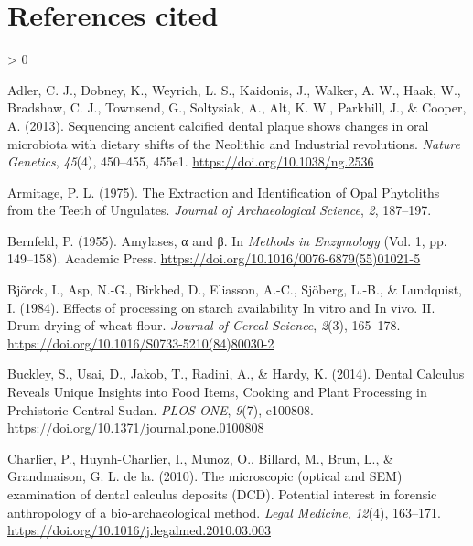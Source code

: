 \documentclass[
]{article}
\newlength{\cslhangindent}
\newenvironment{CSLReferences}[2] %
 {%
  \setlength{\parindent}{0pt}
  \ifodd #1 \everypar{\setlength{\hangindent}{\cslhangindent}}\ignorespaces\fi
  \ifnum #2 > 0
  \setlength{\parskip}{#2\baselineskip}
  \fi
 }%
 {}
\begin{document}
\hypertarget{references-cited}{%
\section*{References cited}\label{references-cited}}

\hypertarget{refs}{}
\begin{CSLReferences}{1}{0}
\leavevmode\hypertarget{ref-adlerSequencingAncientCalcified2013}{}%
Adler, C. J., Dobney, K., Weyrich, L. S., Kaidonis, J., Walker, A. W., Haak, W., Bradshaw, C. J., Townsend, G., Soltysiak, A., Alt, K. W., Parkhill, J., \& Cooper, A. (2013). Sequencing ancient calcified dental plaque shows changes in oral microbiota with dietary shifts of the {Neolithic} and {Industrial} revolutions. \emph{Nature Genetics}, \emph{45}(4), 450--455, 455e1. \url{https://doi.org/10.1038/ng.2536}

\leavevmode\hypertarget{ref-armitageExtractionIdentificationOpal1975}{}%
Armitage, P. L. (1975). The {Extraction} and {Identification} of {Opal Phytoliths} from the {Teeth} of {Ungulates}. \emph{Journal of Archaeological Science}, \emph{2}, 187--197.

\leavevmode\hypertarget{ref-bernfeldAmylase1955}{}%
Bernfeld, P. (1955). Amylases, α and β. In \emph{Methods in {Enzymology}} (Vol. 1, pp. 149--158). {Academic Press}. \url{https://doi.org/10.1016/0076-6879(55)01021-5}

\leavevmode\hypertarget{ref-bjorckStarchProcessing1984}{}%
Björck, I., Asp, N.-G., Birkhed, D., Eliasson, A.-C., Sjöberg, L.-B., \& Lundquist, I. (1984). Effects of processing on starch availability {In} vitro and {In} vivo. {II}. {Drum}-drying of wheat flour. \emph{Journal of Cereal Science}, \emph{2}(3), 165--178. \url{https://doi.org/10.1016/S0733-5210(84)80030-2}

\leavevmode\hypertarget{ref-buckleyDentalCalculusCooking2014}{}%
Buckley, S., Usai, D., Jakob, T., Radini, A., \& Hardy, K. (2014). Dental {Calculus Reveals Unique Insights} into {Food Items}, {Cooking} and {Plant Processing} in {Prehistoric Central Sudan}. \emph{PLOS ONE}, \emph{9}(7), e100808. \url{https://doi.org/10.1371/journal.pone.0100808}

\leavevmode\hypertarget{ref-charlierSEMCalculus2010}{}%
Charlier, P., Huynh-Charlier, I., Munoz, O., Billard, M., Brun, L., \& Grandmaison, G. L. de la. (2010). The microscopic (optical and {SEM}) examination of dental calculus deposits ({DCD}). {Potential} interest in forensic anthropology of a bio-archaeological method. \emph{Legal Medicine}, \emph{12}(4), 163--171. \url{https://doi.org/10.1016/j.legalmed.2010.03.003}


\end{CSLReferences}
\end{document}
